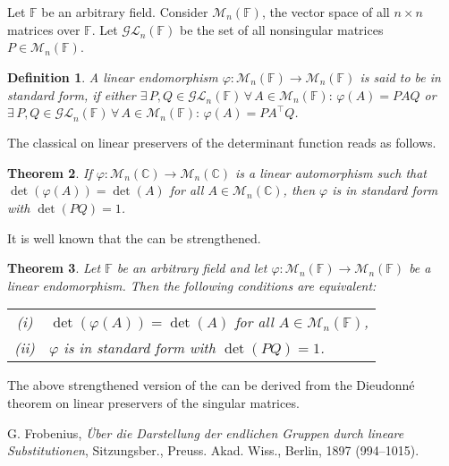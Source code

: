 \documentclass[12pt]{article}
\newtheorem{thm}{Theorem}
\newtheorem{defi}[thm]{Definition}
\begin{document}
Let $\mathbb{F}$ be an arbitrary field. Consider $\mathcal{M}_n (\mathbb{F})$, the vector space of all $n \times n$ matrices over $\mathbb{F}$. Let $\mathcal{GL}_n (\mathbb{F})$ be the set of all nonsingular matrices $P \in \mathcal{M}_n (\mathbb{F})$. 
\begin{defi}
A linear endomorphism $\varphi : \mathcal{M}_n (\mathbb{F}) \longrightarrow \mathcal{M}_n (\mathbb{F})$ is said to be in standard form, if either $\exists\, P, Q \in \mathcal{GL}_n (\mathbb{F})\, \forall\, A \in \mathcal{M}_n (\mathbb{F}) :\, \varphi (A) = P A Q$ or $\exists\, P, Q \in \mathcal{GL}_n (\mathbb{F})\, \forall\, A \in \mathcal{M}_n (\mathbb{F}) :\, \varphi (A) = P A^\top Q$.
\end{defi}

The classical  on linear preservers of the determinant function \cite{frob} reads as follows.
\begin{thm}
If $\varphi : \mathcal{M}_n (\mathbb{C}) \longrightarrow \mathcal{M}_n (\mathbb{C})$ is a linear automorphism such that $\det (\varphi (A)) = \det (A)$ for all $A \in \mathcal{M}_n (\mathbb{C})$, then $\varphi$ is in standard form with
\newline
$\det (P Q) = 1$. 
\end{thm}

It is well known that the  can be strengthened.
\begin{thm}
Let $\mathbb{F}$ be an arbitrary field and let $\varphi : \mathcal{M}_n (\mathbb{F}) \longrightarrow \mathcal{M}_n (\mathbb{F})$ be a linear endomorphism. Then the following conditions are equivalent:\\
\begin{tabular}{cl}
(i)&$\det (\varphi (A)) = \det (A)$ for all $A \in \mathcal{M}_n (\mathbb{F})$,\\
(ii)&$\varphi$ is in standard form with $\det (P Q) = 1$.\\
\end{tabular}
\end{thm}

The above strengthened version of the  can be derived from the Dieudonn\'e theorem on linear preservers of the singular matrices.


\begin{thebibliography}{99}
G. Frobenius, \emph{\"Uber die Darstellung der endlichen Gruppen durch lineare Substitutionen}, Sitzungsber., Preuss. Akad. Wiss., Berlin, 1897 (994--1015).
\end{thebibliography}
\end{document}
